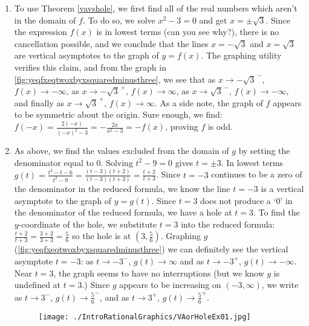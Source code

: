 \begin{ex}
\begin{ex}
\begin{enumerate}

\item  To use Theorem \ref{vavshole}, we first find all of the real numbers which aren't in the domain of $f$.  To do so, we solve $x^2 - 3 = 0$ and get $x = \pm \sqrt{3}$.  Since the expression $f(x)$ is in lowest terms (can you see why?), there is no cancellation possible, and we conclude that the lines $x = -\sqrt{3}$ and $x=\sqrt{3}$ are vertical asymptotes to the graph of $y=f(x)$.  The  graphing utility verifies this claim, and from the graph in \autoref{fig:yeqfxeqtwoxbyxsquaredminusthree}, we see that as $x \rightarrow -\sqrt{3}^{\, -}$, $f(x) \rightarrow -\infty$, as $x\rightarrow -\sqrt{3}^{\, +}$, $f(x) \rightarrow \infty$, as $x \rightarrow \sqrt{3}^{\, -}$, $f(x) \rightarrow -\infty$, and finally as $x\rightarrow \sqrt{3}^{\, +}$, $f(x) \rightarrow \infty$.  As a side note, the graph of $f$ appears to be symmetric about the origin.  Sure enough, we find: $f(-x) = \frac{2(-x)}{(-x)^2-3} = -\frac{2x}{x^2-3} = -f(x)$, proving $f$ is odd.

\item  As above, we find the values excluded from the domain of $g$ by setting the denominator equal to $0$.  Solving $t^2 - 9 = 0$ gives $t = \pm 3$.  In lowest terms $g(t) = \frac{t^2-t-6}{t^2-9} = \frac{(t-3)(t+2)}{(t-3)(t+3)} = \frac{t+2}{t+3}$.  Since $t=-3$ continues to be a zero of the denominator in the reduced formula, we know the line $t=-3$ is a vertical asymptote to the graph of $y=g(t)$.  Since $t=3$  does not produce a `$0$' in the denominator of the reduced formula,  we have a hole at $t=3$.  To find the $y$-coordinate of the hole, we substitute $t=3$ into the reduced formula: $\frac{t+2}{t+3} = \frac{3+2}{3+3} = \frac{5}{6}$  so  the hole is at $\left(3, \frac{5}{6}\right)$. Graphing $g$ (\autoref{fig:yeqfxeqtwoxbyxsquaredminusthree}) we can definitely see the vertical asymptote $t=-3$:  as  $t \rightarrow -3^{-}$, $g(t) \rightarrow \infty$ and as $t \rightarrow -3^{+}$, $g(t) \rightarrow -\infty$.  Near $t=3$, the graph seems to have no interruptions (but we know $g$ is undefined at $t=3$.) Since $g$ appears to be increasing on $(-3, \infty)$,  we write as  $t\rightarrow 3^{-}$, $g(t) \rightarrow \frac{5}{6}^{-}$, and as $t \rightarrow 3^{+}$, $g(t) \rightarrow \frac{5}{6}^{+}$.

\begin{figure}
\begin{center}
  
\texttt{[image: ./IntroRationalGraphics/VAorHoleEx01.jpg]}


\end{center}
\end{figure}
\end{enumerate}
\end{ex}
\end{ex}
